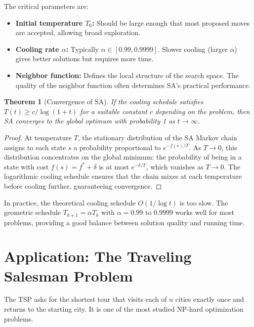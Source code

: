 \documentclass[twoside,12pt]{book}
\theoremstyle{plain}
\newtheorem{theorem}{Theorem}[chapter]
\theoremstyle{definition}
\theoremstyle{remark}
\begin{document}
The critical parameters are:
\begin{itemize}[nosep]
  \item \textbf{Initial temperature $T_0$:} Should be large enough that most proposed moves are accepted, allowing broad exploration.
  \item \textbf{Cooling rate $\alpha$:} Typically $\alpha \in [0.99, 0.9999]$. Slower cooling (larger $\alpha$) gives better solutions but requires more time.
  \item \textbf{Neighbor function:} Defines the local structure of the search space. The quality of the neighbor function often determines SA's practical performance.
\end{itemize}

\begin{theorem}[Convergence of SA]\label{thm:sa-convergence}
If the cooling schedule satisfies $T(t) \geq c / \log(1 + t)$ for a suitable constant $c$ depending on the problem, then SA converges to the global optimum with probability 1 as $t \to \infty$.
\end{theorem}

\begin{proof}
At temperature $T$, the stationary distribution of the SA Markov chain assigns to each state $s$ a probability proportional to $e^{-f(s)/T}$. As $T \to 0$, this distribution concentrates on the global minimum: the probability of being in a state with cost $f(s) = f^* + \delta$ is at most $e^{-\delta/T}$, which vanishes as $T \to 0$. The logarithmic cooling schedule ensures that the chain mixes at each temperature before cooling further, guaranteeing convergence.
\end{proof}

In practice, the theoretical cooling schedule $O(1/\log t)$ is too slow. The geometric schedule $T_{k+1} = \alpha T_k$ with $\alpha = 0.99$ to $0.9999$ works well for most problems, providing a good balance between solution quality and running time.

\section{Application: The Traveling Salesman Problem}
\label{sec:sa-tsp}

The TSP asks for the shortest tour that visits each of $n$ cities exactly once and returns to the starting city. It is one of the most studied NP-hard optimization problems.
\end{document}
